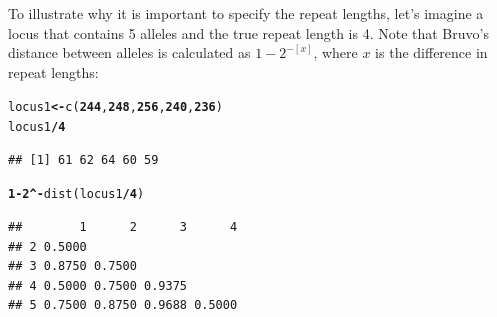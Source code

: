 \documentclass[letterpaper]{article}\usepackage[]{graphicx}\usepackage[]{color}
\makeatletter
\newcommand{\hlnum}[1]{\textcolor[rgb]{0.502,0,0.502}{\textbf{#1}}}%
\newcommand{\hlopt}[1]{\textcolor[rgb]{1,0,0.502}{\textbf{#1}}}%
\newcommand{\hlstd}[1]{\textcolor[rgb]{0,0,0}{#1}}%
\newcommand{\hlkwb}[1]{\textcolor[rgb]{0.502,0.502,0.753}{\textbf{#1}}}%
\newcommand{\hlkwd}[1]{\textcolor[rgb]{0,0.267,0.4}{#1}}%
\newenvironment{kframe}{%
 \def\at@end@of@kframe{}%
 \ifinner\ifhmode%
  \def\at@end@of@kframe{\end{minipage}}%
  \begin{minipage}{\columnwidth}%
 \fi\fi%
 \def\FrameCommand##1{\hskip\@totalleftmargin \hskip-\fboxsep
 \colorbox{shadecolor}{##1}\hskip-\fboxsep
     \hskip-\linewidth \hskip-\@totalleftmargin \hskip\columnwidth}%
 \MakeFramed {\advance\hsize-\width
   \@totalleftmargin\z@ \linewidth\hsize
   \@setminipage}}%
 {\par\unskip\endMakeFramed%
 \at@end@of@kframe}
\newenvironment{knitrout}{}{} %
\makeatother
\begin{document}
To illustrate why it is important to specify the repeat lengths, let's imagine a locus that contains 5 alleles and the true repeat length is 4. Note that Bruvo's distance between alleles is calculated as $1 - 2^{-[x]}$, where $x$ is the difference in repeat lengths:
\begin{knitrout}\footnotesize
{}\color{fgcolor}\begin{kframe}
\begin{alltt}
\hlstd{locus1} \hlkwb{<-} \hlkwd{c}\hlstd{(}\hlnum{244}\hlstd{,} \hlnum{248}\hlstd{,} \hlnum{256}\hlstd{,} \hlnum{240}\hlstd{,} \hlnum{236}\hlstd{)}
\hlstd{locus1}\hlopt{/}\hlnum{4}
\end{alltt}
\begin{verbatim}
## [1] 61 62 64 60 59
\end{verbatim}
\begin{alltt}
\hlnum{1} \hlopt{-} \hlnum{2}\hlopt{^-}\hlkwd{dist}\hlstd{(locus1}\hlopt{/}\hlnum{4}\hlstd{)}
\end{alltt}
\begin{verbatim}
##        1      2      3      4
## 2 0.5000                     
## 3 0.8750 0.7500              
## 4 0.5000 0.7500 0.9375       
## 5 0.7500 0.8750 0.9688 0.5000
\end{verbatim}
\end{kframe}
\end{knitrout}
\end{document}
